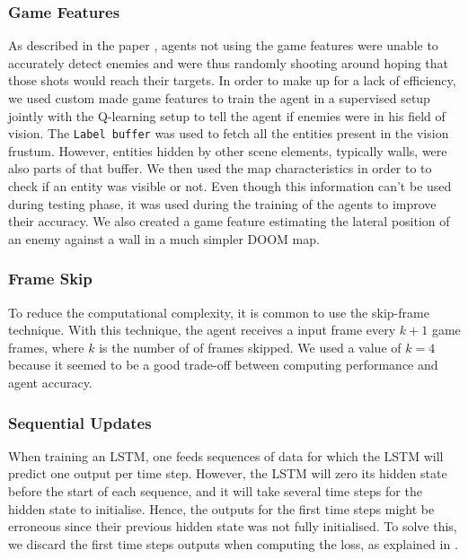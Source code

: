 \documentclass[letterpaper]{article}
\begin{document}
\subsubsection{Game Features}
As described in the paper \citep{Lample2016}, agents not using the game
features were unable to accurately detect enemies and were thus randomly
shooting around hoping that those shots would reach their targets. In order
to make up for a lack of efficiency, we used custom made game features to train the
agent in a supervised setup jointly with the Q-learning setup to tell the
agent if enemies were in his field of
vision. The \texttt{Label buffer} 
was used to fetch all the entities present
in the vision frustum. However, entities hidden by other scene elements,
typically walls, were also parts of that buffer. We then used the map
characteristics in order to to check if an entity was visible or not. Even
though this information can't be used during testing phase, it was used
during the training of the agents to improve their accuracy.
We also created a game feature estimating the lateral position of an enemy
against a wall in a much simpler DOOM map.

\subsubsection{Frame Skip}
To reduce the computational complexity, it is common to use the skip-frame
technique. With this technique, the agent receives a input frame every $k + 1$
game frames, where $k$ is the number of of frames skipped.
We used a value of $k=4$ because it seemed to be a good trade-off between
computing performance and agent accuracy. \cite{Kempka2016}



\subsubsection{Sequential Updates}
When training an LSTM, one feeds sequences of data for which the LSTM will
predict one output per time step. However, the LSTM will zero its hidden state
before the start of each sequence, and it will take several time steps for the
hidden state to initialise. Hence, the outputs for the first time steps might
be erroneous since their previous hidden state was not fully initialised. 
To solve this, we discard the first time steps outputs when computing the loss,
as explained in \citep{Lample2016}.
\end{document}
